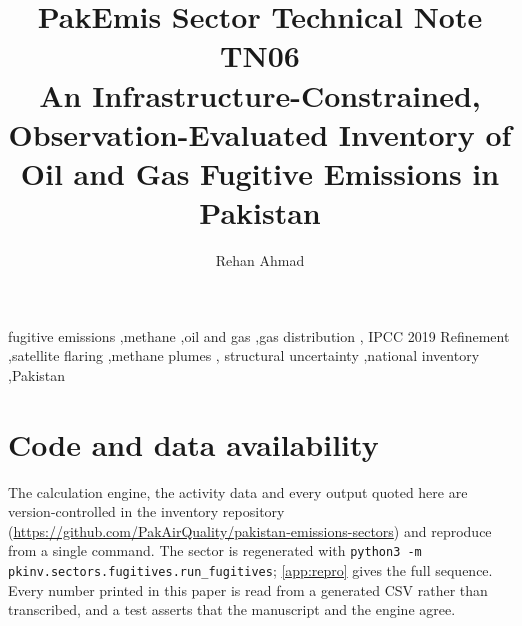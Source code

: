 \documentclass[5p,times,authoryear]{elsarticle}
\begin{document}
\begin{frontmatter}

\title{PakEmis Sector Technical Note TN06\\[4pt]
An Infrastructure-Constrained, Observation-Evaluated Inventory of
Oil and Gas Fugitive Emissions in Pakistan}

\author[paqi]{Rehan Ahmad}

\address[paqi]{Pakistan Air Quality Initiative (PAQI), Karachi, Pakistan}


\begin{abstract}

\end{abstract}

\begin{keyword}
fugitive emissions \sep methane \sep oil and gas \sep gas distribution \sep
IPCC 2019 Refinement \sep satellite flaring \sep methane plumes \sep
structural uncertainty \sep national inventory \sep Pakistan
\end{keyword}

\end{frontmatter}



\ReleaseCover












\FloatBarrier

\section*{Code and data availability}

The calculation engine, the activity data and every output quoted here are version-controlled
in the inventory repository (\url{https://github.com/PakAirQuality/pakistan-emissions-sectors})
and reproduce from a single command. The sector is regenerated with
\texttt{python3 -m pkinv.sectors.fugitives.run\_fugitives}; \ref{app:repro} gives the full
sequence. Every number printed in this paper is read from a generated CSV rather than
transcribed, and a test asserts that the manuscript and the engine agree.
\end{document}
